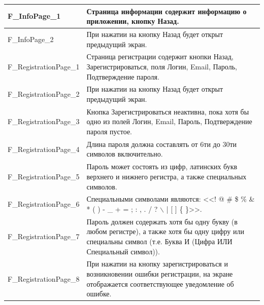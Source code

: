 \documentclass[a4paper, 14pt]{article}
\begin{document}
\begin{longtable}{| p{} | p{} |}
    F\_InfoPage\_1                  & Страница информации содержит информацию о приложении, кнопку Назад.                                                                                                                \\ \hline
    F\_InfoPage\_2                  & При нажатии на кнопку Назад будет открыт предыдущий экран.                                                                                                                         \\ \hline

    F\_RegistrationPage\_1          & Страница регистрации содержит кнопки Назад, Зарегистрироваться, поля Логин, Email, Пароль, Подтверждение пароля.                                                                   \\ \hline
    F\_RegistrationPage\_2          & При нажатии на кнопку Назад будет открыт предыдущий экран.                                                                                                                         \\ \hline
    F\_RegistrationPage\_3          & Кнопка Зарегистрироваться неактивна, пока хотя бы одно из полей Логин, Email, Пароль, Подтверждение пароля пустое.                                                                 \\ \hline
    F\_RegistrationPage\_4          & Длина пароля должна составлять от 6ти до 30ти символов включительно.                                                                                                               \\ \hline
    F\_RegistrationPage\_5          & Пароль может состоять из цифр, латинских букв верхнего и нижнего регистра, а также специальных символов.                                                                           \\ \hline
    F\_RegistrationPage\_6          & Специальными символами являются: <<! @ \# \$ \% \& * ( ) - \_ + = ; : , . / ? $\backslash$ | [ ] \{ \}>>.                                                                          \\ \hline
    F\_RegistrationPage\_7          & Пароль должен содержать хотя бы одну букву (в любом регистре), а также хотя бы одну цифру или специальны символ (т.е. Буква И (Цифра ИЛИ Специальный символ)).                     \\ \hline
    F\_RegistrationPage\_8          & При нажатии на кнопку зарегистрироваться и возникновении ошибки регистрации, на экране отображается соответствующее уведомление об ошибке.                                         \\ \hline

\end{longtable}
\end{document}
